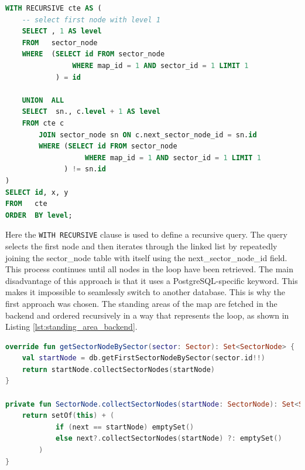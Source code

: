 \begin{lstlisting}[language=SQL, caption=Recursive Query, label=lst:recursive_query]
WITH RECURSIVE cte AS (
    -- select first node with level 1
    SELECT , 1 AS level
    FROM   sector_node
    WHERE  (SELECT id FROM sector_node 
                WHERE map_id = 1 AND sector_id = 1 LIMIT 1
            ) = id

    UNION  ALL
    SELECT  sn., c.level + 1 AS level
    FROM cte c
        JOIN sector_node sn ON c.next_sector_node_id = sn.id 
        WHERE (SELECT id FROM sector_node 
                   WHERE map_id = 1 AND sector_id = 1 LIMIT 1
              ) != sn.id
)
SELECT id, x, y
FROM   cte
ORDER  BY level;
\end{lstlisting}

Here the \texttt{WITH RECURSIVE} clause is used to define a recursive query. The query selects the first node and then iterates through the linked list by repeatedly joining the sector\_node table with itself using the next\_sector\_node\_id field. This process continues until all nodes in the loop have been retrieved. The main disadvantage of this approach is that it uses a PostgreSQL-specific keyword. This makes it impossible to seamlessly switch to another database. This is why the first approach was chosen. The standing areas of the map are fetched in the backend and ordered recursively in a way that represents the loop, as shown in Listing \ref{lst:standing_area_backend}.

\begin{lstlisting}[language=Kotlin, caption=Standing Area Backend, label=lst:standing_area_backend]
override fun getSectorNodeBySector(sector: Sector): Set<SectorNode> {
    val startNode = db.getFirstSectorNodeBySector(sector.id!!)
    return startNode.collectSectorNodes(startNode)
}

private fun SectorNode.collectSectorNodes(startNode: SectorNode): Set<SectorNode> {
    return setOf(this) + (
            if (next == startNode) emptySet() 
            else next?.collectSectorNodes(startNode) ?: emptySet()
        )
}
\end{lstlisting}